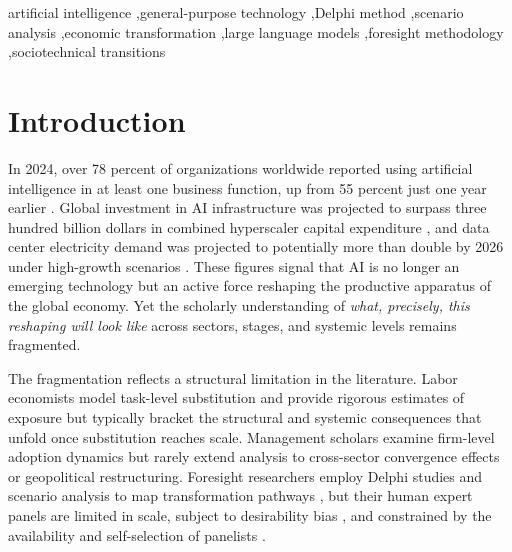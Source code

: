 \documentclass[preprint,review,12pt]{elsarticle}
\begin{document}
\begin{frontmatter}
\begin{abstract}
exploratory observations requiring larger samples, not established findings. Framed through General Purpose Technology theory and the Multi-Level Perspective, the study contributes a cross-sector transformation map and a scalable, replicable instrument for early-stage foresight, explicitly a hypothesis-generating reconnaissance, not validated forecasting.
\end{abstract}

\begin{keyword}
artificial intelligence \sep general-purpose technology \sep Delphi method \sep scenario analysis \sep economic transformation \sep large language models \sep foresight methodology \sep sociotechnical transitions
\end{keyword}

\end{frontmatter}


\section{Introduction}
\label{sec:introduction}

In 2024, over 78 percent of organizations worldwide reported using artificial intelligence in at least one business function, up from 55 percent just one year earlier \citep{mckinsey2025ai}. Global investment in AI infrastructure was projected to surpass three hundred billion dollars in combined hyperscaler capital expenditure \citep{morganstanley2024capex}, and data center electricity demand was projected to potentially more than double by 2026 under high-growth scenarios \citep{iea2024electricity}. These figures signal that AI is no longer an emerging technology but an active force reshaping the productive apparatus of the global economy. Yet the scholarly understanding of \textit{what, precisely, this reshaping will look like} across sectors, stages, and systemic levels remains fragmented.

The fragmentation reflects a structural limitation in the literature. Labor economists model task-level substitution \citep{acemoglu2018artificial, acemoglu2019automation, acemoglu2022aijobs, eloundou2023gpts, autor2024applying, frank2019toward} and provide rigorous estimates of exposure but typically bracket the structural and systemic consequences that unfold once substitution reaches scale. Management scholars examine firm-level adoption dynamics \citep{raisch2021automation, kanbach2023genai, dwivedi2023chatgpt} but rarely extend analysis to cross-sector convergence effects or geopolitical restructuring. Foresight researchers employ Delphi studies and scenario analysis to map transformation pathways \citep{culot2020manufacturing, fritschy2019autonomous}, but their human expert panels are limited in scale, subject to desirability bias \citep{ecken2011desirability}, and constrained by the availability and self-selection of panelists \citep{foerster2014delphipanel, sokolov2025delphias}.
\end{document}
